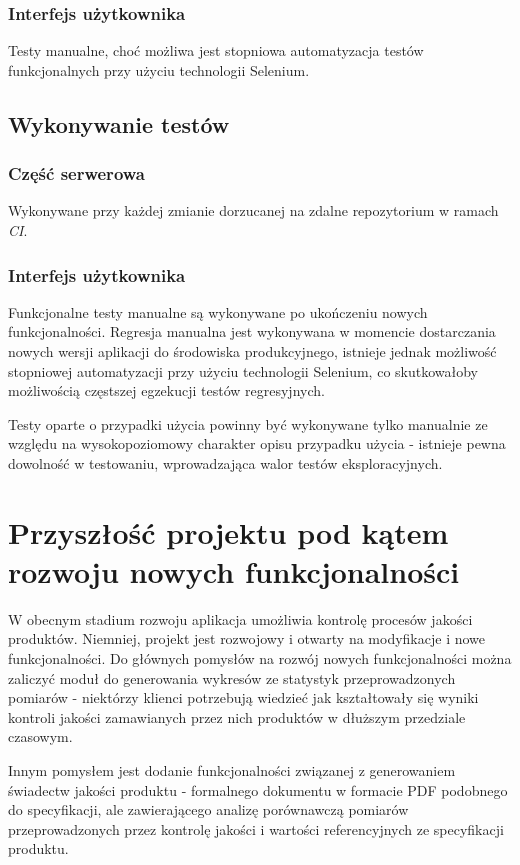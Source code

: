 \documentclass[declaration,shortabstract]{iithesis}
\begin{document}
\subsection{Interfejs użytkownika}
Testy manualne, choć możliwa jest stopniowa automatyzacja
testów funkcjonalnych przy użyciu technologii Selenium.

\section{Wykonywanie testów}
\subsection{Część serwerowa}
Wykonywane przy każdej zmianie dorzucanej na zdalne repozytorium w ramach \emph{CI}. 

\subsection{Interfejs użytkownika}
Funkcjonalne testy manualne są wykonywane po ukończeniu nowych funkcjonalności. Regresja manualna jest wykonywana w momencie dostarczania nowych wersji aplikacji do środowiska produkcyjnego, istnieje jednak możliwość stopniowej automatyzacji przy użyciu technologii Selenium, co skutkowałoby możliwością częstszej egzekucji testów regresyjnych.

Testy oparte o przypadki użycia powinny być wykonywane tylko manualnie ze względu na wysokopoziomowy charakter opisu przypadku użycia - istnieje pewna dowolność w testowaniu, wprowadzająca walor testów eksploracyjnych.

\chapter{Przyszłość projektu pod kątem rozwoju nowych funkcjonalności}
W obecnym stadium rozwoju aplikacja umożliwia kontrolę procesów jakości produktów. Niemniej, projekt jest rozwojowy i otwarty na modyfikacje i nowe funkcjonalności. Do głównych pomysłów na rozwój nowych funkcjonalności można zaliczyć moduł do generowania wykresów ze statystyk przeprowadzonych pomiarów - niektórzy klienci potrzebują wiedzieć jak kształtowały się wyniki kontroli jakości zamawianych przez nich produktów w dłuższym przedziale czasowym. 

Innym pomysłem jest dodanie funkcjonalności związanej z generowaniem świadectw jakości produktu - formalnego dokumentu w formacie PDF podobnego do specyfikacji, ale zawierającego analizę porównawczą pomiarów przeprowadzonych przez kontrolę jakości i wartości referencyjnych ze specyfikacji produktu.
\end{document}
